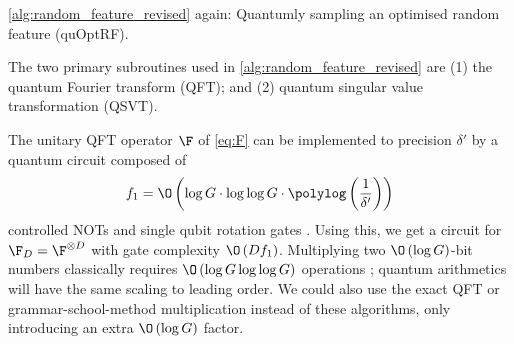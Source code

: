 \begin{algorithm}[H]
  \caption*{\cref{alg:random_feature_revised} again: Quantumly sampling an optimised random feature (quOptRF).}
  \begin{algorithmic}[1]
\end{algorithmic}
\end{algorithm}

The two primary subroutines used in \cref{alg:random_feature_revised} are (1) the quantum Fourier transform (QFT); and (2) quantum singular value transformation (QSVT).

The unitary QFT operator $\F$ of \cref{eq:F} can be implemented to precision $\delta'$ by a quantum circuit composed of 
\begin{equation}
  \label{eq:runtime_F_D}
  f_1 = \O\left(\log G\cdot \log\log G\cdot \polylog\left(\frac{1}{\delta'}\right)\right)
\end{equation}
 controlled NOTs and single qubit rotation gates \cite{H2}.
Using this, we get a circuit for $\F_{D}=\F^{\otimes D}$ with gate complexity $\O\left(Df_1\right)$. 
Multiplying two $\O\left(\log G\right)$-bit numbers classically requires $\O\left(\log G \log\log G \right)$
operations \cite{harvey:hal-02070778}; quantum arithmetics will have the same scaling to leading order.
We could also use the exact QFT \cite{Nielsen2010} or grammar-school-method multiplication instead of these algorithms, only introducing an extra ${\O\left(\log G \right)}$ factor.

